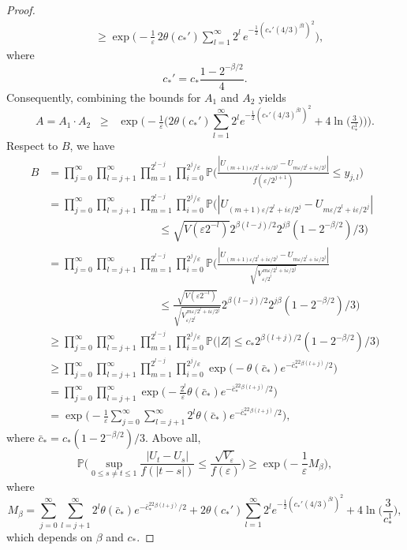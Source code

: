 \documentclass[preprint,12pt]{elsarticle}
\theoremstyle{definition}  %
\theoremstyle{plain}  %
\begin{document}
\begin{proof}
\begin{align*}
&\geq \exp\!\Big( -\tfrac{1}{\varepsilon}\,2\theta(c_*') \sum_{l=1}^\infty 2^l\, e^{-\tfrac{1}{2}(c_*'(4/3)^{\beta l})^2} \Big), 
\end{align*} 
where 
\[ c_*' = c_* \frac{1-2^{-\beta/2}}{4}. \] 
Consequently, combining the bounds for $A_1$ and $A_2$ yields 
\[ A = A_1\cdot A_2 \;\;\geq\;\; \exp\!\Big( -\tfrac{1}{\varepsilon}\Big( 2\theta(c_*')\sum_{l=1}^\infty 2^l e^{-\tfrac{1}{2}(c_*'(4/3)^{\beta l})^2} +4\ln\!\Big(\tfrac{3}{c_*^1}\Big) \Big) \Big). \] 
Respect to $B$, we have 
\begin{align*} 
B&=\prod^\infty_{j=0}\prod^\infty_{l=j+1} \prod^{2^{l-j}}_{m=1}\prod^{2^j/\varepsilon}_{i=0}\mathbb{P}\Big(\frac{|U_{(m+1)\varepsilon/2^l+i\varepsilon/2^j}-U_{m\varepsilon/2^l+i\varepsilon/2^j}|}{f(\varepsilon/ 2^{j+1})}\leq y_{j,l}\Big)\\ 
&= \prod^\infty_{j=0}\prod^\infty_{l=j+1} \prod^{2^{l-j}}_{m=1}\prod^{2^j/\varepsilon}_{i=0}\mathbb{P}\Big(|U_{(m+1)\varepsilon/2^l+i\varepsilon/2^j}-U_{m\varepsilon/2^l+i\varepsilon/2^j}|\\ 
&\qquad\qquad\qquad\qquad\qquad\leq \sqrt{V(\varepsilon2^{-l})} 2^{\beta(l-j)/2}2^{j\beta}(1-2^{-\beta/2})/3\Big)\\ 
&= \prod^\infty_{j=0}\prod^\infty_{l=j+1} \prod^{2^{l-j}}_{m=1}\prod^{2^j/\varepsilon}_{i=0}\mathbb{P}\Big(\frac{|U_{(m+1)\varepsilon/2^l+i\varepsilon/2^j}-U_{m\varepsilon/2^l+i\varepsilon/2^j}|}{\sqrt{V_{\varepsilon/2^l}^{\,m\varepsilon/2^l+i\varepsilon/2^j}}} \\ 
&\qquad\qquad\qquad\qquad\qquad\leq \frac{\sqrt{V(\varepsilon2^{-l})}}{\sqrt{V_{\varepsilon/2^l}^{\,m\varepsilon/2^l+i\varepsilon/2^j}}} 2^{\beta(l-j)/2}2^{j\beta}(1-2^{-\beta/2})/3\Big)\\ 
&\geq \prod^\infty_{j=0}\prod^\infty_{l=j+1} \prod^{2^{l-j}}_{m=1}\prod^{2^j/\varepsilon}_{i=0} \mathbb{P}\Big(|Z|\leq c_* 2^{\beta(l+j)/2}(1-2^{-\beta/2})/3 \Big)\\ 
&\geq \prod^\infty_{j=0}\prod^\infty_{l=j+1} \prod^{2^{l-j}}_{m=1}\prod^{2^j/\varepsilon}_{i=0} \exp\Big(-\theta(\bar{c}_*)e^{-\bar{c}_*^22^{\beta(l+j)}/2}\Big)\\ 
&=\prod^\infty_{j=0}\prod^\infty_{l=j+1} \exp\Big(-\frac{2^l}{\varepsilon}\theta(\bar{c}_*)e^{-\bar{c}_*^22^{\beta(l+j)}/2}\Big)\\ 
&=\exp\Big(-\frac{1}{\varepsilon}\sum^\infty_{j=0}\sum^\infty_{l=j+1}2^l\theta(\bar{c}_*)e^{-\bar{c}_*^22^{\beta(l+j)}/2}\Big), 
\end{align*} 
where $\bar{c}_* = c_*(1-2^{-\beta/2})/3.$ 
Above all, 
\begin{equation*} 
\mathbb{P} \Big( \sup_{0\leq s\neq t\leq 1} \frac{|U_t-U_s|}{f(|t-s|)} \leq \frac{\sqrt{V_\varepsilon}}{f(\varepsilon)} \Big)\geq \exp\Big(-\frac{1}{\varepsilon}M_\beta \Big), 
\end{equation*} 
where 
\[ M_\beta = \sum^\infty_{j=0}\sum^\infty_{l=j+1}2^l\theta(\bar{c}_*)e^{-\bar{c}_*^22^{\beta(l+j)}/2} +  2\theta(c_*')\sum_{l=1}^\infty 2^l e^{-\tfrac{1}{2}(c_*'(4/3)^{\beta l})^2} +4\ln\!\Big(\frac{3}{c_*^1}\Big), \] 
which depends on $\beta$ and $c_*$. 
\end{proof}
\end{document}
